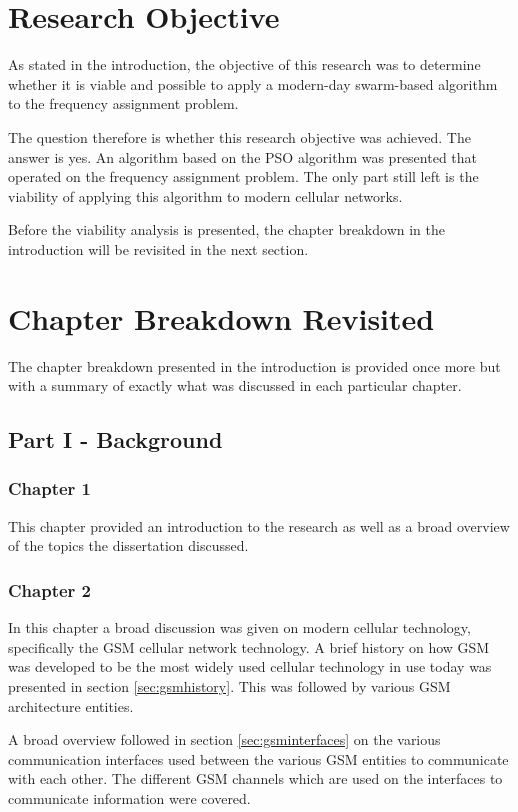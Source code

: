 \section{Research Objective}
As stated in the introduction, the objective of this research was to determine whether it is viable and possible to apply a modern-day swarm-based algorithm to the frequency assignment problem. 

The question therefore is whether this research objective was achieved. The answer is yes. An algorithm based on the PSO algorithm was presented that operated on the frequency assignment problem. The only part still left is the viability of applying this algorithm to modern cellular networks.

Before the viability analysis is presented, the chapter breakdown in the introduction will be revisited in the next section.

\section{Chapter Breakdown Revisited}
The chapter breakdown presented in the introduction is provided once more but with a summary of exactly what was discussed in each particular chapter.
\subsection{Part I - Background}
\subsubsection{Chapter 1}
This chapter provided an introduction to the research as well as a broad overview of the topics the dissertation discussed. 
\subsubsection{Chapter 2}
In this chapter a broad discussion was given on modern cellular technology, specifically the GSM cellular network technology. A brief history on how GSM was developed to be the most widely used cellular technology in use today was presented in section \ref{sec:gsmhistory}. This was followed by various GSM architecture entities.

A broad overview followed in section \ref{sec:gsminterfaces} on the various communication interfaces used between the various GSM entities to communicate with each other. The different GSM channels which are used on the interfaces to communicate information were covered.

